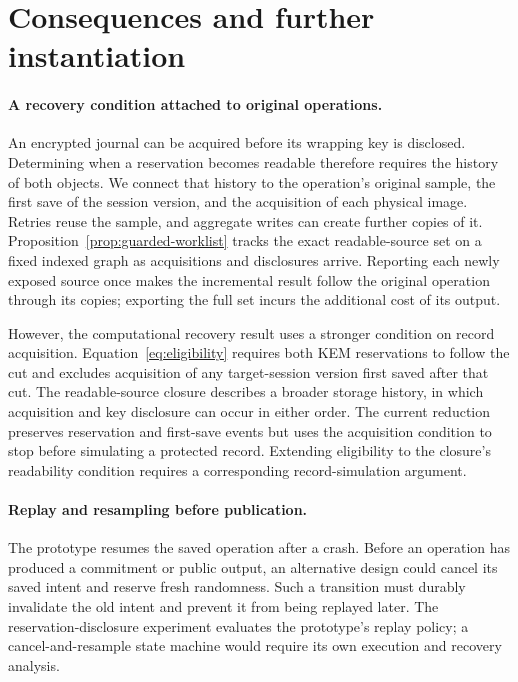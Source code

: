 \documentclass[pdflatex]{sn-jnl}
\theoremstyle{thmstyleone}
\theoremstyle{thmstylethree}
\theoremstyle{thmstyletwo}
\begin{document}
\section{Consequences and further instantiation}
\label{sec:discussion}

\paragraph{A recovery condition attached to original operations.}
An encrypted journal can be acquired before its wrapping key is
disclosed. Determining when a reservation becomes readable therefore
requires the history of both objects. We connect that history to the
operation's original sample, the first save of the session version,
and the acquisition of each physical image. Retries reuse the sample,
and aggregate writes can create further copies of it.
Proposition~\ref{prop:guarded-worklist} tracks the exact readable-source
set on a fixed indexed graph as acquisitions and disclosures arrive.
Reporting each newly exposed source once makes the incremental result
follow the original operation through its copies; exporting the full
set incurs the additional cost of its output.

However, the computational recovery result uses a stronger condition on
record acquisition.
Equation~\eqref{eq:eligibility} requires both
KEM reservations to follow the cut and excludes acquisition of any target-session version first
saved after that cut. The readable-source closure describes a broader
storage history, in which acquisition and key disclosure can occur in
either order. The current reduction preserves reservation and first-save
events but uses the acquisition condition to stop before simulating a
protected record. Extending eligibility to the closure's readability
condition requires a corresponding record-simulation argument.

\paragraph{Replay and resampling before publication.}
The prototype resumes the saved operation after a crash. Before an
operation has produced a commitment or public output, an alternative
design could cancel its saved intent and reserve fresh randomness. Such
a transition must durably invalidate the old intent and prevent it from
being replayed later. The reservation-disclosure experiment evaluates the
prototype's replay policy; a cancel-and-resample state machine would
require its own execution and recovery analysis.
\end{document}
